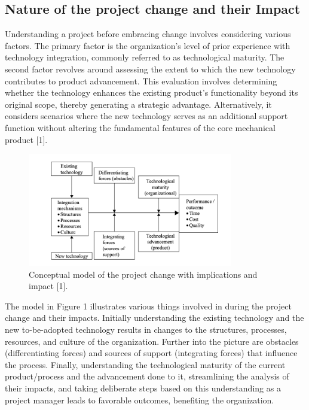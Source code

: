 \documentclass{article}
\begin{document}
\subsection{Nature of the project change and their Impact}
Understanding a project before embracing change involves considering various factors. The primary factor is the organization's level of prior experience with technology integration, commonly referred to as technological maturity. The second factor revolves around assessing the extent to which the new technology contributes to product advancement. This evaluation involves determining whether the technology enhances the existing product's functionality beyond its original scope, thereby generating a strategic advantage. Alternatively, it considers scenarios where the new technology serves as an additional support function without altering the fundamental features of the core mechanical product [1].


\begin{figure}[h]
    \centering
    \includegraphics[width=0.8\textwidth]{Figure1.png}
    \caption{Conceptual model of the project change with implications and impact [1].}
    \label{fig:conceptual-model}
\end{figure}

\noindent The model in Figure 1 illustrates various things involved in during the project change and their impacts. Initially understanding the existing technology and the new to-be-adopted technology results in changes to the structures, processes, resources, and culture of the organization. Further into the picture are obstacles (differentiating forces) and sources of support (integrating forces) that influence the process. Finally, understanding the technological maturity of the current product/process and the advancement done to it, streamlining the analysis of their impacts, and taking deliberate steps based on this understanding as a project manager leads to favorable outcomes, benefiting the organization.
\end{document}
